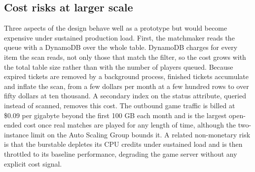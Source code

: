     \subsection{Cost risks at larger scale}

    Three aspects of the design behave well as a prototype but would become expensive under sustained production load. 
    First, the matchmaker reads the queue with a DynamoDB  over the whole  table. 
    DynamoDB charges for every item the scan reads, not only those that match the  filter, so the cost grows with the total table size rather than with the number of players queued. 
    Because expired tickets are removed by a background process, finished tickets accumulate and inflate the scan, from a few dollars per month at a few hundred rows to over fifty dollars at ten thousand. A secondary index on the status attribute, queried instead of scanned, removes this cost. The outbound game traffic is billed at \$0.09 per gigabyte beyond the first 100 GB each month and is the largest open-ended cost once real matches are played for any length of time, although the two-instance limit on the Auto Scaling Group bounds it. A related non-monetary risk is that the burstable  depletes its CPU credits under sustained load and is then throttled to its baseline performance, degrading the game server without any explicit cost signal.

